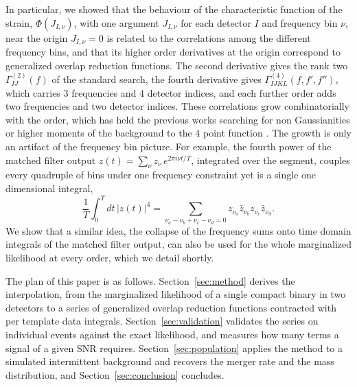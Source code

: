 \documentclass[aps,prd,twocolumn,superscriptaddress,nofootinbib]{revtex4-2}
\begin{document}
In particular, we showed that the behaviour of the characteristic function of the strain, $\Phi(J_{I,\nu})$, with one argument $J_{I,\nu}$ for each detector $I$ and frequency bin $\nu$, near the origin $J_{I,\nu} = 0$ is related to the correlations among the different frequency bins, and that its higher order derivatives at the origin correspond to generalized overlap reduction functions. The second derivative gives the rank two $\Gamma^{(2)}_{IJ}(f)$ of the standard search, the fourth derivative gives $\Gamma^{(4)}_{IJKL}(f, f', f'')$, which carries 3 frequencies and 4 detector indices, and each further order adds two frequencies and two detector indices. These correlations grow combinatorially with the order, which has held the previous works searching for non Gaussianities or higher moments of the background to the 4 point function \cite{Thrane2013,MartelliniRegimbau2014,Seto2009}. The growth is only an artifact of the frequency bin picture. For example, the fourth power of the matched filter output $z(t) = \sum_\nu z_\nu\, e^{2\pi i \nu t / T}$, integrated over the segment, couples every quadruple of bins under one frequency constraint yet is a single one dimensional integral,
\begin{equation}
\frac{1}{T} \int_0^T dt\, |z(t)|^4 =
\sum_{\nu_a - \nu_b + \nu_c - \nu_d = 0}
z_{\nu_a} \bar z_{\nu_b} z_{\nu_c} \bar z_{\nu_d}.
\label{eq:fourpoint}
\end{equation}
We show that a similar idea, the collapse of the frequency sums onto time domain integrals of the matched filter output, can also be used for the whole marginalized likelihood at every order, which we detail shortly.

The plan of this paper is as follows. Section~\ref{sec:method} derives the interpolation, from the marginalized likelihood of a single compact binary in two detectors to a series of generalized overlap reduction functions contracted with per template data integrals. Section~\ref{sec:validation} validates the series on individual events against the exact likelihood, and measures how many terms a signal of a given SNR requires. Section~\ref{sec:population} applies the method to a simulated intermittent background and recovers the merger rate and the mass distribution, and Section~\ref{sec:conclusion} concludes.
\end{document}
